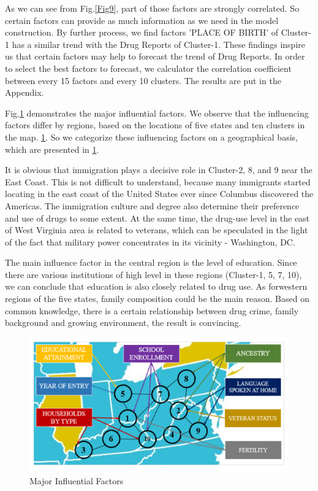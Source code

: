 \documentclass[12pt]{article}
\begin{document}
As we can see from Fig.\ref{Fig9}, part of those factors are strongly correlated. So certain factors can provide as much information as we need in the model construction. By further process, we find factors 'PLACE OF BIRTH' of Cluster-1 has a similar trend with the Drug Reports of Cluster-1. These findings inspire us that certain factors may help to forecast the trend of Drug Reports. In order to select the best factors to forecast, we calculator the correlation coefficient between every 15 factors and every 10 clusters. The results are put in the Appendix.

Fig.\ref{Fig11} demonstrates the major influential factors. We observe that the influencing factors differ by regions, based on the locations of five states and ten clusters in the map. \ref{Fig11}. So we categorize these influencing factors on a geographical basis, which are presented in \ref{Fig11}.

It is obvious that immigration plays a decisive role in Cluster-2, 8, and 9 near the East Coast. This is not difficult to understand, because many immigrants started locating in the east coast of the United States ever since Columbus discovered the Americas. The immigration culture and degree also determine their preference and use of drugs to some extent. At the same time, the drug-use level in the east of West Virginia area is related to veterans, which can be speculated in the light of the fact that military power concentrates in its vicinity - Washington, DC. 

The main influence factor in the central region is the level of education. Since there are various institutions of high level in these regions (Cluster-1, 5, 7, 10), we can conclude that education is also closely related to drug use. As forwestern regions of the five states, family composition could be the main reason. Based on common knowledge, there is a certain relationship between drug crime, family background and growing environment, the result is convincing.

\begin{figure}[H]
	\centering
	\includegraphics[scale=0.7]{./figures/11.png}
	\caption{Major Influential Factors}
	\label{Fig11}
\end{figure}
\end{document}

